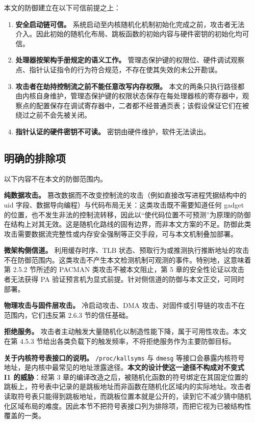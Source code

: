 本文的防御建立在以下可信前提之上：

\begin{enumerate}
    \item \textbf{安全启动链可信。} 系统启动至内核随机化机制初始化完成之前，攻击者无法介入。因此初始的随机化布局、跳板函数的初始内容与硬件密钥的初始化均可信。
    \item \textbf{处理器按架构手册规定的语义工作。} 管理态保护键的权限位、硬件调试观察点、指针认证指令的行为符合规范，不存在使其失效的未公开勘误。
    \item \textbf{攻击者在劫持控制流之前不能任意改写内存权限。} 本文的两条只执行路径都由内核自身维护，管理态保护键的权限状态保存在每处理器核的寄存器中，观察点的配置保存在调试寄存器中，二者都不经普通页表；该假设保证它们在被绕过之前不会先被关闭。
    \item \textbf{指针认证的硬件密钥不可读。} 密钥由硬件维护，软件无法读出。
\end{enumerate}

\subsection{明确的排除项}

以下内容不在本文的防御范围内。

\textbf{纯数据攻击。} 篡改数据而不改变控制流的攻击（例如直接改写进程凭据结构中的 uid 字段、数据导向编程）与代码布局无关：这类攻击既不需要知道任何 gadget 的位置，也不发生非法的控制流转移，因此以“使代码位置不可预测”为原理的防御在结构上对其无效。这是随机化路线的固有边界，而非本文方案的不足。防御此类攻击需要数据流完整性或内存安全强制等正交手段，可与本文机制叠加部署。

\textbf{微架构侧信道。} 利用缓存时序、TLB 状态、预取行为或推测执行推断地址的攻击不在防御范围内。这类攻击不产生本文检测机制可观测的事件。特别地，这意味着第 2.5.2 节所述的 PACMAN 类攻击不被本文阻止，第 5 章的安全性论证以攻击者无法获得 PA 验证预言机为显式前提。针对侧信道的防御与本文正交，可同时部署。

\textbf{物理攻击与固件层攻击。} 冷启动攻击、DMA 攻击、对固件或引导链的攻击不在范围内，它们违反第 2.6.3 节的信任基础。

\textbf{拒绝服务。} 攻击者主动触发大量随机化以制造性能下降，属于可用性攻击。本文在第 4.5.3 节给出各类负载下的触发频率，不将拒绝服务作为主要防御目标。

\textbf{关于内核符号表接口的说明。} \lstinline[breaklines=false]@/proc/kallsyms@ 与 \lstinline[breaklines=false]@dmesg@ 等接口会暴露内核符号地址，是内核中最常见的地址泄露途径。\textbf{本文的设计使这一途径不构成对不变式 I1 的威胁}：经第 3 章的编译改造之后，被随机化函数的符号绑定在其固定位置的跳板上，符号表中记录的是跳板地址而非函数在随机化区域内的实际地址。攻击者读取符号表只能得到跳板地址，而跳板位置本就是公开的，读到它不减少猜中随机化区域布局的难度。因此本节不把符号表接口列为排除项，而把它视为已被结构性覆盖的一类。

